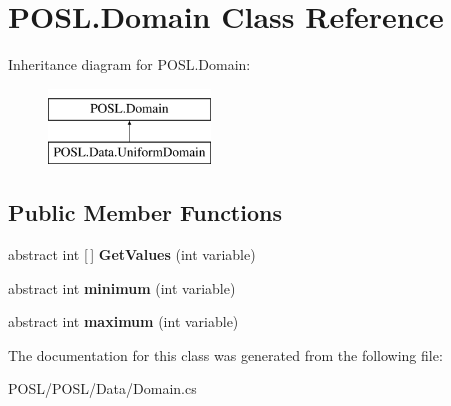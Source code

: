 \hypertarget{classPOSL_1_1Domain}{}\section{P\+O\+S\+L.\+Domain Class Reference}
\label{classPOSL_1_1Domain}
Inheritance diagram for P\+O\+S\+L.\+Domain\+:\begin{figure}[H]
\begin{center}
\leavevmode
\includegraphics[height=2.000000cm]{classPOSL_1_1Domain}
\end{center}
\end{figure}
\subsection*{Public Member Functions}
\begin{DoxyCompactItemize}
\item 
\mbox{\label{classPOSL_1_1Domain_a922d6ee4f986156f642a6e2329fd2342}} 
abstract int \mbox{[}$\,$\mbox{]} {\bfseries Get\+Values} (int variable)
\item 
\mbox{\label{classPOSL_1_1Domain_ac4499b68d14f91a16e9a6c3a59daed4f}} 
abstract int {\bfseries minimum} (int variable)
\item 
\mbox{\label{classPOSL_1_1Domain_a2bfcaefd8f65cb4212d6457cefec7d2b}} 
abstract int {\bfseries maximum} (int variable)
\end{DoxyCompactItemize}


The documentation for this class was generated from the following file\+:\begin{DoxyCompactItemize}
\item 
P\+O\+S\+L/\+P\+O\+S\+L/\+Data/Domain.\+cs\end{DoxyCompactItemize}
